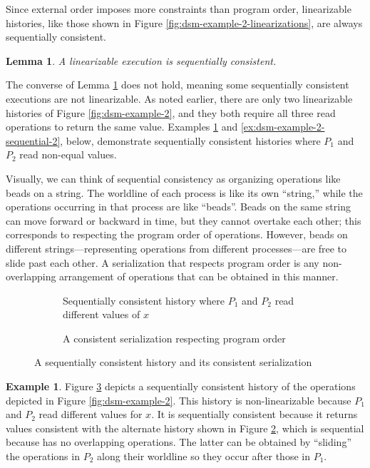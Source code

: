 \documentclass[]             %
{NASA}                       %
\newtheorem{lemma}[theorem]{Lemma}
\theoremstyle{definition}
\newtheorem{example}[theorem]{Example}
\begin{document}
Since external order imposes more constraints than program order,
linearizable histories, like those shown in Figure
\ref{fig:dsm-example-2-linearizations}, are always sequentially
consistent.
\begin{lemma}
  \label{lem:linearsequential}
  A linearizable execution is sequentially consistent.
\end{lemma}

The converse of Lemma \ref{lem:linearsequential} does not hold,
meaning some sequentially consistent executions are not
linearizable. As noted earlier, there are only two linearizable
histories of Figure \ref{fig:dsm-example-2}, and they both require all
three read operations to return the same value. Examples
\ref{ex:dsm-example-2-sequential-1} and
\ref{ex:dsm-example-2-sequential-2}, below, demonstrate sequentially
consistent histories where $P_1$ and $P_2$ read non-equal values.

Visually, we can think of sequential consistency as organizing
operations like beads on a string. The worldline of each process is
like its own ``string,'' while the operations occurring in that
process are like ``beads''. Beads on the same string can move forward
or backward in time, but they cannot overtake each other; this
corresponds to respecting the program order of operations. However,
beads on different strings---representing operations from different
processes---are free to slide past each other.  A serialization that
respects program order is any non-overlapping arrangement of
operations that can be obtained in this manner.

\begin{figure}
  \begin{subfigure}{1\textwidth}
    \setlength\belowcaptionskip{4ex}
    \centering
    
    \caption{Sequentially consistent history where $P_1$ and $P_2$ read different values of $x$}
    \label{fig:dsm-example-2-sequential-1-sub}
  \end{subfigure}
  \begin{subfigure}{1\textwidth}
    
    \caption{A consistent serialization respecting program order}
    \label{fig:dsm-example-2-sequential-1-serial}
  \end{subfigure}
  \caption{A sequentially consistent history and its consistent serialization}
  \label{fig:dsm-example-2-sequential-1}
\end{figure}

\begin{example}
  \label{ex:dsm-example-2-sequential-1}
  Figure \ref{fig:dsm-example-2-sequential-1} depicts a sequentially
  consistent history of the operations depicted in Figure
  \ref{fig:dsm-example-2}. This history is non-linearizable because
  $P_1$ and $P_2$ read different values for $x$. It is sequentially
  consistent because it returns values consistent with the alternate
  history shown in Figure \ref{fig:dsm-example-2-sequential-1-serial},
  which is sequential because has no overlapping operations. The
  latter can be obtained by ``sliding'' the operations in $P_2$ along
  their worldline so they occur after those in $P_1$.
\end{example}
\end{document}

